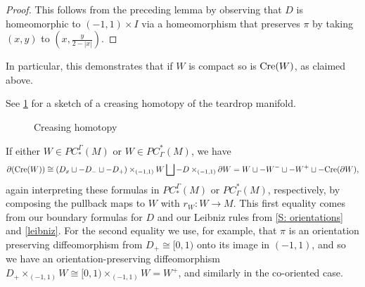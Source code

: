 \begin{proof}
	This follows from the preceding lemma by observing that $D$ is homeomorphic to $(-1,1) \times I$ via a homeomorphism that preserves $\pi$ by taking $(x,y)$ to $\left(x, \frac{y}{2-|x|}\right)$.
\end{proof}

In particular, this demonstrates that if $W$ is compact so is $\mathrm{Cre}(W)$, as claimed above.

See \cref{F: creasing} for a sketch of a creasing homotopy of the teardrop manifold.

\begin{figure}
	
	\caption{Creasing homotopy}
	\label{F: creasing}
\end{figure}

If either $W \in PC^\Gamma_*(M)$ or $W \in PC_\Gamma^*(M)$, we have
\begin{equation}\label{E: bd crease}
	\partial(\mathrm{Cre}(W))\cong(D_x \sqcup -D_- \sqcup -D_+)\times_{(-1,1)} W \bigsqcup -D\times_{(-1,1)}\partial W = W \sqcup -W^- \sqcup -W^+ \sqcup -\mathrm{Cre}(\partial W),
\end{equation}
again interpreting these formulas in $PC^\Gamma_*(M)$ or $PC_\Gamma^*(M)$, respectively, by composing the pullback maps to $W$ with $r_W \colon W \to M$.
This first equality comes from our boundary formulas for $D$ and our Leibniz rules from \cref{S: orientations} and \cref{leibniz}.
For the second equality we use, for example, that $\pi$ is an orientation preserving diffeomorphism from $D_+ \cong [0,1)$ onto its image in $(-1,1)$, and so we have an orientation-preserving diffeomorphism $D_+\times_{(-1,1)} W \cong [0,1)\times_{(-1,1)} W = W^+$, and similarly in the co-oriented case.

\begin{comment}
	Next let us see how to use creasing in the context of chains and cochains.

	If $W \in PC_*^{\Gamma}(M)$ represented by $r_W \colon W \to M$, then $\Cre(W)$ is also compact and oriented, and we have a map $r_{\Cre(W)} = r_W\pi_W \colon W \to M$ with $\pi_W$ being the projection of $\Cre(W) = D\times_{(-1,1)}W$ to $W$.
	Thus $r_{\Cre(W)} \colon \Cre(W) \to M$ gives us a new element of $PC_*^\Gamma(M)$.
	If $W \in PC^*_\Gamma(M)$, then to get an element $\Cre(W) \in PC^*_\Gamma(M)$ we will need to assume that $\varphi \colon W \to (-1,1)$ is a composition of maps $W \xr{r_W}M \xr{\phi} (-1,1)$.
	We can then form the space $\Cre(W)$ as the pullback by $\phi r_W$ of $\pi \colon D \to (-1,1)$.
	As $\pi$ is proper and co-oriented, the pullback $\pi^* = \pi_W \colon \Cre(W) \to W$ will be proper and co-oriented by Lemma \ref{L: co-orientable pullback} and Definition \ref{D: pullback coorient}.
	We then let $r_{\Cre(W)} = r_W \pi^*$ to obtain an element of $\Cre(W) \in PC^*_\Gamma(M)$.
	By \cite[Propositions 7.4]{Joy12} and Theorem \ref{leibniz}, our boundary formulas for $\Cre(W)$ continue to hold as elements of $PC_*^{\Gamma}(M)$ or $PC^*_{\Gamma}(M)$.
\end{comment}


